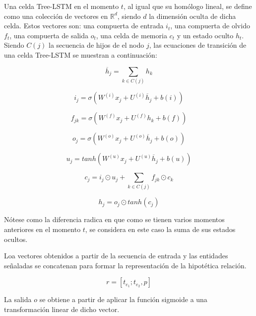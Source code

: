 Una celda Tree-LSTM en el momento $t$, al igual que su homólogo lineal, se define como una colección de vectores en $\mathbb{R}^d$, siendo $d$ la dimensión oculta de dicha celda.
Estos vectores son: una compuerta de entrada $i_t$, una compuerta de olvido $f_t$, una compuerta de salida $o_t$, una celda de memoria $c_t$ y un estado oculto $h_t$. Siendo $C(j)$ la secuencia de hijos de el nodo $j$, las ecuaciones de transición de una celda Tree-LSTM se muestran a continuación:

\begin{equation*}
	\overline{h}_j = \sum_{k\in C(j)} h_k
\end{equation*}

\begin{equation*}
i_j = \sigma(W^{(i)}x_j + U^{(i)}\overline{h}_j + b(i))
\end{equation*}

\begin{equation*}
f_{jk} = \sigma(W^{(f)}x_j + U^{(f)}h_k + b(f))
\end{equation*}

\begin{equation*}
o_j = \sigma(W^{(o)}x_j + U^{(o)}\overline{h}_j + b(o))
\end{equation*}

\begin{equation*}
u_j = tanh(W^{(u)}x_j + U^{(u)}\overline{h}_j + b(u))
\end{equation*}

\begin{equation*}
c_j = i_j \odot u_j + \sum_{k\in C(j)} f_{jk} \odot c_k
\end{equation*}

\begin{equation*}
h_j = o_j \odot tanh(c_j)
\end{equation*}

Nótese como la diferencia radica en que como se tienen varios momentos anteriores en el momento $t$, se considera en este caso la suma de sus estados ocultos.

Loa vectores obtenidos a partir de la secuencia de entrada y las entidades señaladas se concatenan para formar la representación de la hipotética relación.

\begin{equation*}
	r = [t_{e_1};t_{e_2}, p]
\end{equation*}

La salida $o$ se obtiene a partir de aplicar la función sigmoide a una transformación linear de dicho vector.

